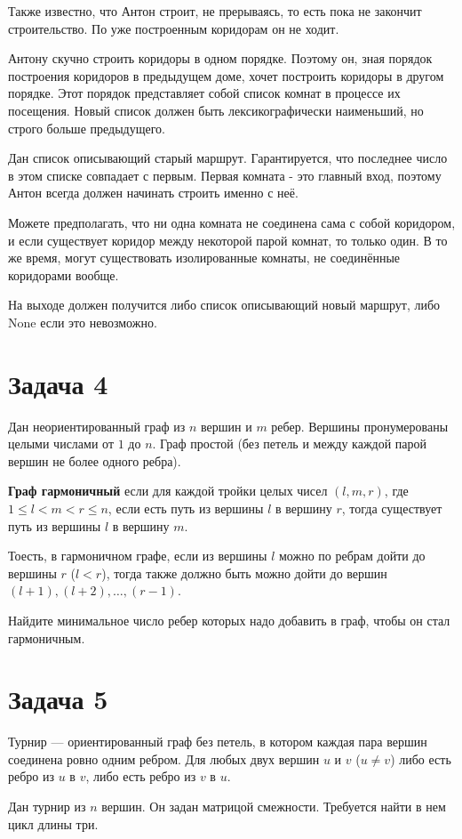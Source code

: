 \documentclass{extarticle}
\begin{document}
Также известно, что Антон строит, не прерываясь, то есть пока не
закончит строительство. По уже построенным коридорам он не ходит.

Антону скучно строить коридоры в одном порядке. Поэтому он,
зная порядок построения коридоров в предыдущем доме, хочет
построить коридоры в другом порядке.
Этот порядок представляет собой список комнат в процессе их
посещения.
Новый список должен быть лексикографически наименьший,
но строго больше предыдущего.

Дан список описывающий старый маршрут.
Гарантируется, что последнее число в этом списке
совпадает с первым.
Первая комната - это главный вход, поэтому Антон всегда
должен начинать строить именно с неё.

Можете предполагать, что ни одна комната не соединена сама
с собой коридором, и если существует коридор между
некоторой парой комнат, то только один.
В то же время, могут существовать изолированные комнаты,
не соединённые коридорами вообще.

На выходе должен получится либо список описывающий новый маршрут,
либо None если это невозможно.

\section*{Задача 4}
\label{sec:org7eced27}
Дан неориентированный граф из \(n\) вершин
и \(m\) ребер.
Вершины пронумерованы целыми числами от \(1\) до \(n\).
Граф простой (без петель и между каждой парой вершин не более одного ребра).

\textbf{Граф гармоничный} если для каждой тройки целых чисел \((l,m,r)\), где
\(1 \leq l < m < r \leq n\),
если есть путь из вершины \(l\) в вершину \(r\),
тогда существует путь из вершины \(l\) в вершину \(m\).

Тоесть, в гармоничном графе, если из вершины \(l\)
можно по ребрам дойти до вершины
\(r\) (\(l<r\)), тогда также должно быть можно
дойти до вершин \((l+1),(l+2),\dots,(r−1)\).

Найдите минимальное число ребер которых надо добавить в граф,
чтобы он стал гармоничным.

\section*{Задача 5}
\label{sec:orgab4e343}
Турнир — ориентированный граф без петель, в котором каждая
пара вершин соединена ровно одним ребром.
Для любых двух вершин \(u\) и \(v\) (\(u \neq v\)) либо есть ребро из
\(u\) в \(v\), либо есть ребро из \(v\) в \(u\).

Дан турнир из \(n\) вершин.
Он задан матрицой смежности.
Требуется найти в нем цикл длины три.
\end{document}
